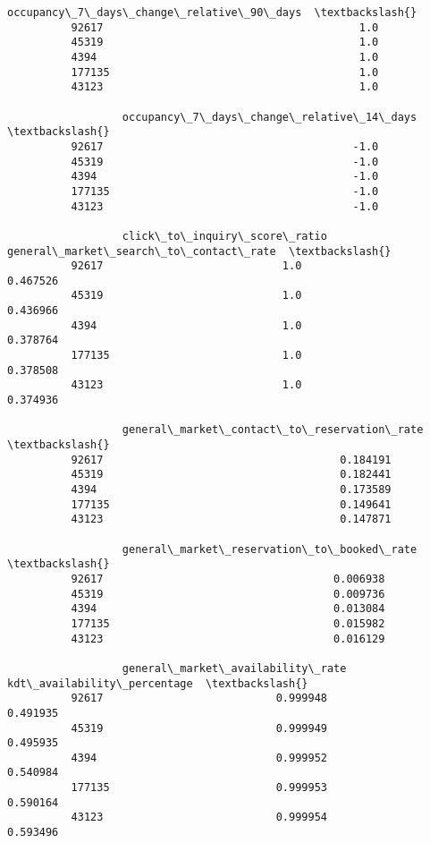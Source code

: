 \documentclass[11pt]{article}
\begin{document}
\begin{Verbatim}[commandchars=\\\{\}]
                  occupancy\_7\_days\_change\_relative\_90\_days  \textbackslash{}
          92617                                        1.0   
          45319                                        1.0   
          4394                                         1.0   
          177135                                       1.0   
          43123                                        1.0   
          
                  occupancy\_7\_days\_change\_relative\_14\_days  \textbackslash{}
          92617                                       -1.0   
          45319                                       -1.0   
          4394                                        -1.0   
          177135                                      -1.0   
          43123                                       -1.0   
          
                  click\_to\_inquiry\_score\_ratio  general\_market\_search\_to\_contact\_rate  \textbackslash{}
          92617                            1.0                               0.467526   
          45319                            1.0                               0.436966   
          4394                             1.0                               0.378764   
          177135                           1.0                               0.378508   
          43123                            1.0                               0.374936   
          
                  general\_market\_contact\_to\_reservation\_rate  \textbackslash{}
          92617                                     0.184191   
          45319                                     0.182441   
          4394                                      0.173589   
          177135                                    0.149641   
          43123                                     0.147871   
          
                  general\_market\_reservation\_to\_booked\_rate  \textbackslash{}
          92617                                    0.006938   
          45319                                    0.009736   
          4394                                     0.013084   
          177135                                   0.015982   
          43123                                    0.016129   
          
                  general\_market\_availability\_rate  kdt\_availability\_percentage  \textbackslash{}
          92617                           0.999948                     0.491935   
          45319                           0.999949                     0.495935   
          4394                            0.999952                     0.540984   
          177135                          0.999953                     0.590164   
          43123                           0.999954                     0.593496   
          

\end{Verbatim}
\end{document}

